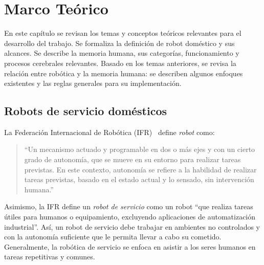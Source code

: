 \chapter{Marco Teórico}\label{chapter:theory}



En este capítulo se revisan los temas y conceptos teóricos relevantes para el desarrollo del trabajo. Se formaliza la definición de robot doméstico y sus alcances. Se describe la memoria humana, sus categorías, funcionamiento y procesos cerebrales relevantes. Basado en los temas anteriores, se revisa la relación entre robótica y la memoria humana: se describen algunos enfoques existentes y las reglas generales para su implementación.

\section{Robots de servicio domésticos}\label{sec:domestic_robots}

La Federación Internacional de Robótica (IFR)~\cite{IFR} define \textit{robot} como:
\begin{quotation}
	``Un mecanismo actuado y programable en dos o más ejes y con un cierto grado de autonomía, que se mueve en su entorno para realizar tareas previstas. En este contexto, autonomía se refiere a la habilidad de realizar tareas previstas, basado en el estado actual y lo sensado, sin intervención humana.''
\end{quotation}

Asimismo, la IFR define un \textit{robot de servicio} como un robot ``que realiza tareas útiles para humanos o equipamiento, excluyendo aplicaciones de automatización industrial''. Así, un robot de servicio debe trabajar en ambientes no controlados y con la autonomía suficiente que le permita llevar a cabo su cometido. Generalmente, la robótica de servicio se enfoca en asistir a los seres humanos en tareas repetitivas y comunes.

